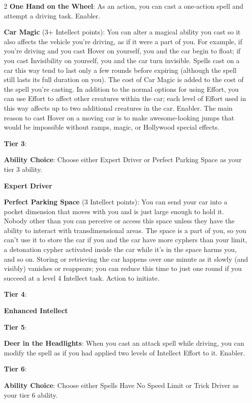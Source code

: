 \begin{multicols}{2}
\textbf{One Hand on the Wheel}: As an action, you can cast a one-action spell and attempt a driving task. Enabler.

\textbf{Car Magic} (3+ Intellect points): You can alter a magical ability you cast so it also affects the vehicle you’re driving, as if it were a part of you. For example, if you’re driving and you cast Hover on yourself, you and the car begin to float; if you cast Invisibility on yourself, you and the car turn invisible. Spells cast on a car this way tend to last only a few rounds before expiring (although the spell still lasts its full duration on you). The cost of Car Magic is added to the cost of the spell you’re casting. In addition to the normal options for using Effort, you can use Effort to affect other creatures within the car; each level of Effort used in this way affects up to two additional creatures in the car. Enabler.
The main reason to cast Hover on a moving car is to make awesome-looking jumps that would be impossible without ramps, magic, or Hollywood special effects.

\textbf{Tier 3}:

\textbf{Ability Choice}: Choose either Expert Driver or Perfect Parking Space as your tier 3 ability.

\textbf{Expert Driver}

\textbf{Perfect Parking Space} (3 Intellect points): You can send your car into a pocket dimension that moves with you and is just large enough to hold it. Nobody other than you can perceive or access this space unless they have the ability to interact with transdimensional areas. The space is a part of you, so you can’t use it to store the car if you and the car have more cyphers than your limit, a detonation cypher activated inside the car while it’s in the space harms you, and so on. Storing or retrieving the car happens over one minute as it slowly (and visibly) vanishes or reappears; you can reduce this time to just one round if you succeed at a level 4 Intellect task. Action to initiate.

\textbf{Tier 4}:

\textbf{Enhanced Intellect}
 
\textbf{Tier 5}:

\textbf{Deer in the Headlights}: When you cast an attack spell while driving, you can modify the spell as if you had applied two levels of Intellect Effort to it. Enabler.

\textbf{Tier 6}:

\textbf{Ability Choice}: Choose either Spells Have No Speed Limit or Trick Driver as your tier 6 ability.


\end{multicols}
